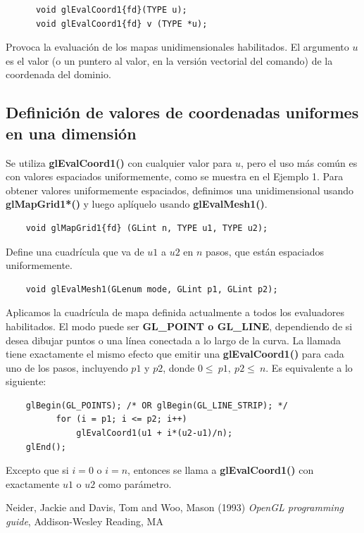 \begin{lstlisting}
      void glEvalCoord1{fd}(TYPE u);
      void glEvalCoord1{fd} v (TYPE *u);
\end{lstlisting}
Provoca la evaluación de los mapas unidimensionales habilitados. El argumento $u$ es el valor (o un puntero al valor, en la versión vectorial del comando) de la coordenada del dominio. \\

\subsection{Definición de valores de coordenadas uniformes en una dimensión}

Se utiliza \textbf{glEvalCoord1()} con cualquier valor para $u$, pero el uso más común es con valores espaciados uniformemente, como se muestra en el Ejemplo 1. Para obtener valores uniformemente espaciados, definimos una unidimensional usando \textbf{glMapGrid1*()} y luego aplíquelo usando \textbf{glEvalMesh1()}.

\begin{lstlisting}
    void glMapGrid1{fd} (GLint n, TYPE u1, TYPE u2);
\end{lstlisting}
Define una cuadrícula que va de $u1$ a $u2$ en $n$ pasos, que están espaciados uniformemente.
\begin{lstlisting}
    void glEvalMesh1(GLenum mode, GLint p1, GLint p2);
\end{lstlisting}

Aplicamos la cuadrícula de mapa definida actualmente a todos los evaluadores habilitados. El modo puede ser \textbf{GL\_POINT o GL\_LINE}, dependiendo de si desea dibujar puntos o una línea conectada a lo largo de la curva. La llamada tiene exactamente el mismo efecto que emitir una \textbf{glEvalCoord1()} para cada uno de los pasos, incluyendo $p1$ y $p2$, donde $0\le\ p1,\ p2\le\ n$. Es equivalente a lo siguiente: \\

\begin{lstlisting}
    glBegin(GL_POINTS); /* OR glBegin(GL_LINE_STRIP); */
          for (i = p1; i <= p2; i++)
              glEvalCoord1(u1 + i*(u2-u1)/n);
    glEnd();
\end{lstlisting}

Excepto que si $i = 0$ o $i = n$, entonces se llama a \textbf{glEvalCoord1()} con exactamente $u1$ o $u2$ como parámetro.

\newpage

\begin{thebibliography}{9}
    Neider, Jackie and Davis, Tom and Woo, Mason (1993) \emph{OpenGL programming guide}, Addison-Wesley Reading, MA
\end{thebibliography}
